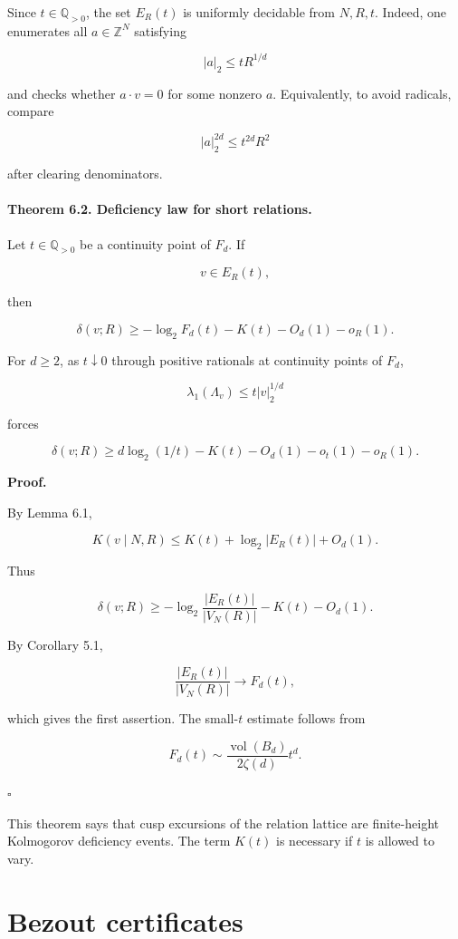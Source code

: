 \documentclass[11pt]{article}
\begin{document}
Since $t\in\mathbb Q_{>0}$, the set $E_R(t)$ is uniformly decidable from $N,R,t$. Indeed, one enumerates all $a\in\mathbb Z^N$ satisfying

\[
|a|_2\le tR^{1/d}
\]

and checks whether $a\cdot v=0$ for some nonzero $a$. Equivalently, to avoid radicals, compare

\[
|a|_2^{2d}\le t^{2d}R^2
\]

after clearing denominators.

\paragraph{Theorem 6.2. Deficiency law for short relations.}

Let $t\in\mathbb Q_{>0}$ be a continuity point of $F_d$. If

\[
v\in E_R(t),
\]

then

\[
\delta(v;R)
\ge
-\log_2F_d(t)-K(t)-O_d(1)-o_R(1).
\]

For $d\ge2$, as $t\downarrow0$ through positive rationals at continuity points of $F_d$,

\[
\lambda_1(\Lambda_v)\le t|v|_2^{1/d}
\]

forces

\[
\delta(v;R)
\ge
d\log_2(1/t)-K(t)-O_d(1)-o_t(1)-o_R(1).
\]

\noindent\textbf{Proof.}

By Lemma 6.1,

\[
K(v\mid N,R)
\le
K(t)+\log_2|E_R(t)|+O_d(1).
\]

Thus

\[
\delta(v;R)
\ge
-\log_2\frac{|E_R(t)|}{|V_N(R)|}
-K(t)-O_d(1).
\]

By Corollary 5.1,

\[
\frac{|E_R(t)|}{|V_N(R)|}\to F_d(t),
\]

which gives the first assertion. The small-$t$ estimate follows from

\[
F_d(t)\sim \frac{\operatorname{vol}(B_d)}{2\zeta(d)}t^d.
\]

$\square$

This theorem says that cusp excursions of the relation lattice are finite-height Kolmogorov deficiency events. The term $K(t)$ is necessary if $t$ is allowed to vary.

\section{Bezout certificates}
\end{document}
